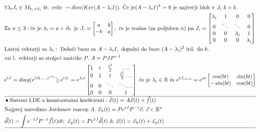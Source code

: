 \documentclass[a4paper, 8pt]{article}
\newcommand{\mth}[1]{\ensuremath{\mathbb{#1}}}
\newcommand{\R}{\mth{R}}
\begin{document}
\begin{align*}
		&\forall \lambda_i J_i \in M_{k_i\times k_i}~\text{št. celic}~=dim(Ker(A - \lambda_i I)).~\text{Če je} (A - \lambda_i I)^k = 0~\text{je največji blok v}~J_i~ k\times k. \\
		& \text{Za}~ n \leq 3:\text{če je}~\lambda_i = a + ib,~\text{je}~J_i = \begin{bmatrix}
			a & b \\
			-b & a
		\end{bmatrix},~\text{če je realna (za poljuben $n$) pa}~J_i = \begin{bmatrix}
		\lambda_i & 1 & 0 & 0\\
		0 & \ddots& \ddots & 0 \\
		0 & 0 & \lambda_i & 1 \\
		0 & 0 & 0 &\lambda_i\\
		\end{bmatrix} \\
		& \text{Lastni vektorji za}~\lambda_i: ~\text{Določi bazo za}~A - \lambda_i I,~\text{dopolni do baze}~(A-\lambda_i)^2~\text{itd. do}~ k. \\
		&\text{vsi l. vektorji so stolpci matrike}~ P. ~A = PJP^{-1}\\
		& e^{tJ} = diag(e^{tJ_1, \ldots, e^{tJ_s}}); e^{tJ_i} = e^{\lambda_it}\begin{bmatrix}
			1 & t & \frac{t^2}{2} & \ldots \\
			0 & 1 & t & \frac{t^2}{2} \ldots \\
			0 & 0 & \ddots & \ddots\ldots \\
			0 & 0 & 0 & 1\\
		\end{bmatrix}~\text{če je}~\lambda_i\in\R~\text{in}~ e^{tJ_{a\pm ib}} = e^{at}\begin{bmatrix}
		\cos(bt) & \sin(bt) \\
		-\sin(bt) & \cos(bt)
		\end{bmatrix} \\ \hline
		&\bullet\text{Sistemi LDE s konstantnimi koeficienti}: \dot{\vec{x}}(t) = A\vec{x}(t) + \vec{f}(t)\\
		& \text{Najprej naredimo Jordanov razcep}~A.~\vec{x}_h(t) = Pe^{tJ}P^{-1}\vec{c};~\vec{c}\in\R^n\\
		& \vec{d}(t) = \int e^{-tJ}P^{-1}\vec{f}(t)dt;~\vec{x}_p(t)=Pe^{tJ}\vec{d}(t)~\&~\vec{x}(t) = \vec{x}_h(t) + \vec{x}_p(t)\\ \hline

\end{align*}
\end{document}
